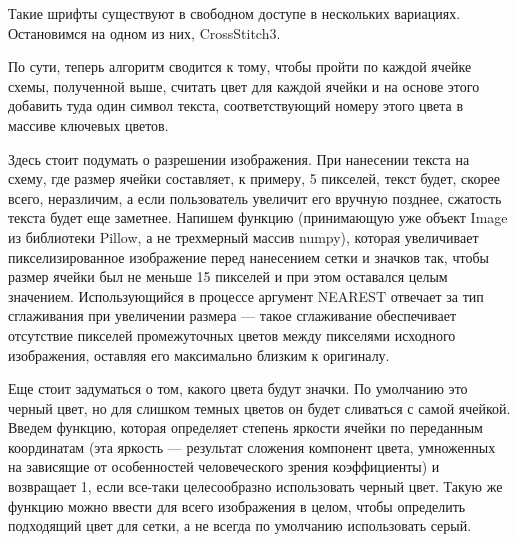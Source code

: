 \documentclass[12pt]{article}
\begin{document}
{	Такие шрифты существуют в свободном доступе в нескольких вариациях. Остановимся на одном из них, CrossStitch3. 
	
	\begin{figure}[bh]
		\noindent{}
	\end{figure}
	
	По сути, теперь алгоритм сводится к тому, чтобы пройти по каждой ячейке схемы, полученной выше, считать цвет для каждой ячейки и на основе этого добавить туда один символ текста, соответствующий номеру этого цвета в массиве ключевых цветов.
	
	Здесь стоит подумать о разрешении изображения. При нанесении текста на схему, где размер ячейки составляет, к примеру, 5 пикселей, текст будет, скорее всего, неразличим, а если пользователь увеличит его вручную позднее, сжатость текста будет еще заметнее. Напишем функцию (принимающую уже объект Image из библиотеки Pillow, а не трехмерный массив numpy), которая увеличивает пикселизированное изображение перед нанесением сетки и значков так, чтобы размер ячейки был не меньше 15 пикселей и при этом оставался целым значением. Использующийся в процессе аргумент NEAREST отвечает за тип сглаживания при увеличении размера --- такое сглаживание обеспечивает отсутствие пикселей промежуточных цветов между пикселями исходного изображения, оставляя его максимально близким к оригиналу.
	
	
	
	Еще стоит задуматься о том, какого цвета будут значки. По умолчанию это черный цвет, но для слишком темных цветов он будет сливаться с самой ячейкой. Введем функцию, которая определяет степень яркости ячейки по переданным координатам (эта яркость --- результат сложения компонент цвета, умноженных на зависящие от особенностей человеческого зрения коэффициенты) и возвращает 1, если все-таки целесообразно использовать черный цвет. Такую же функцию можно ввести для всего изображения в целом, чтобы определить подходящий цвет для сетки, а не всегда по умолчанию использовать серый.
	
}
\end{document}
